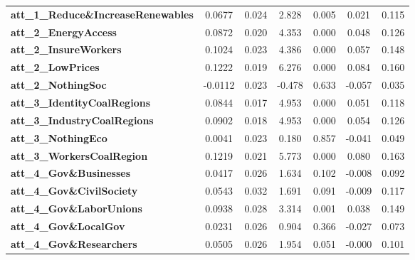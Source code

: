 \begin{center}
\begin{tabular}{lcccccc}
\textbf{att\_1\_Reduce\&IncreaseRenewables} &       0.0677  &        0.024     &     2.828  &         0.005        &        0.021    &        0.115     \\
\textbf{att\_2\_EnergyAccess}               &       0.0872  &        0.020     &     4.353  &         0.000        &        0.048    &        0.126     \\
\textbf{att\_2\_InsureWorkers}              &       0.1024  &        0.023     &     4.386  &         0.000        &        0.057    &        0.148     \\
\textbf{att\_2\_LowPrices}                  &       0.1222  &        0.019     &     6.276  &         0.000        &        0.084    &        0.160     \\
\textbf{att\_2\_NothingSoc}                 &      -0.0112  &        0.023     &    -0.478  &         0.633        &       -0.057    &        0.035     \\
\textbf{att\_3\_IdentityCoalRegions}        &       0.0844  &        0.017     &     4.953  &         0.000        &        0.051    &        0.118     \\
\textbf{att\_3\_IndustryCoalRegions}        &       0.0902  &        0.018     &     4.953  &         0.000        &        0.054    &        0.126     \\
\textbf{att\_3\_NothingEco}                 &       0.0041  &        0.023     &     0.180  &         0.857        &       -0.041    &        0.049     \\
\textbf{att\_3\_WorkersCoalRegion}          &       0.1219  &        0.021     &     5.773  &         0.000        &        0.080    &        0.163     \\
\textbf{att\_4\_Gov\&Businesses}            &       0.0417  &        0.026     &     1.634  &         0.102        &       -0.008    &        0.092     \\
\textbf{att\_4\_Gov\&CivilSociety}          &       0.0543  &        0.032     &     1.691  &         0.091        &       -0.009    &        0.117     \\
\textbf{att\_4\_Gov\&LaborUnions}           &       0.0938  &        0.028     &     3.314  &         0.001        &        0.038    &        0.149     \\
\textbf{att\_4\_Gov\&LocalGov}              &       0.0231  &        0.026     &     0.904  &         0.366        &       -0.027    &        0.073     \\
\textbf{att\_4\_Gov\&Researchers}           &       0.0505  &        0.026     &     1.954  &         0.051        &       -0.000    &        0.101     \\

\end{tabular}
\end{center}
